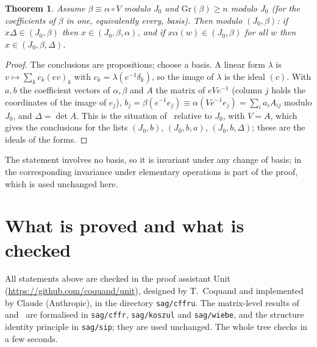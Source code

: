 \documentclass[11pt]{amsart}
\newtheorem{theorem}{Theorem}
\theoremstyle{definition}
\theoremstyle{remark}
\newcommand{\code}[1]{\texttt{#1}}
\newcommand{\Gr}{\mathrm{Gr}}
\begin{document}
\begin{theorem}\label{thm:wiebe}
Assume $\beta\equiv\alpha\circ V$ modulo $J_0$ and $\Gr(\beta)\geq n$
modulo $J_0$ (for the coefficients of $\beta$ in one, equivalently every,
basis).  Then modulo $(J_0,\beta)$: if $x\Delta\in(J_0,\beta)$ then
$x\in(J_0,\beta,\alpha)$, and if $x\alpha(w)\in(J_0,\beta)$ for all $w$
then $x\in(J_0,\beta,\Delta)$.
\end{theorem}

\begin{proof}
The conclusions are propositions; choose a basis.  A linear form
$\lambda$ is $v\mapsto\sum_kc_k(ev)_k$ with $c_k=\lambda(e^{-1}\delta_k)$,
so the image of $\lambda$ is the ideal $(c)$.  With $a,b$ the coefficient
vectors of $\alpha,\beta$ and $A$ the matrix of $eVe^{-1}$ (column $j$
holds the coordinates of the image of $e_j$),
$b_j=\beta(e^{-1}e_j)\equiv\alpha(Ve^{-1}e_j)=\sum_ia_iA_{ij}$ modulo
$J_0$, and $\Delta=\det A$.  This is the situation
of~\cite[Theorem~11]{CT} relative to $J_0$, with $V=A$, which gives the
conclusions for the lists $(J_0,b)$, $(J_0,b,a)$, $(J_0,b,\Delta)$; these
are the ideals of the forms.
\end{proof}

The statement involves no basis, so it is invariant under any change of
basis; in~\cite{CT} the corresponding invariance under elementary
operations is part of the proof, which is used unchanged here.

\section{What is proved and what is checked}

All statements above are checked in the proof assistant Unit
(\url{https://github.com/coquand/unit}), designed by T.~Coquand and
implemented by Claude (Anthropic), in the directory \code{sag/cffru}.  The
matrix-level results of~\cite{CQ} and~\cite{CT} are formalised in
\code{sag/cffr}, \code{sag/koszul} and \code{sag/wiebe}, and the
structure identity principle in \code{sag/sip}; they are used unchanged.
The whole tree checks in a few seconds.
\end{document}
